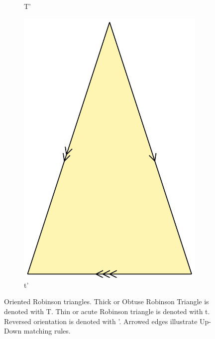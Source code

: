 \documentclass[
  oneside,
  11pt, a4paper,
  footinclude=true,
  headinclude=true,
  cleardoublepage=empty
]{scrbook}
\begin{document}
\begin{figure}[h]
        \begin{subfigure}[t]{0.4\textwidth}
                \caption*{\Large T'}
        \end{subfigure}\hfill
        \begin{subfigure}[t]{0.3\textwidth}
                \includegraphics[width=\textwidth]{T'SRob}
                \caption*{\Large t'}
        \end{subfigure}  
        \caption{Oriented Robinson triangles. Thick or Obtuse Robinson Triangle is denoted with T. Thin or acute Robinson triangle is denoted with t. Reversed orientation is denoted with '. Arrowed edges illustrate Up-Down matching rules.}  
        \label{fig:OrientedRob}                    
\end{figure}
\end{document}
